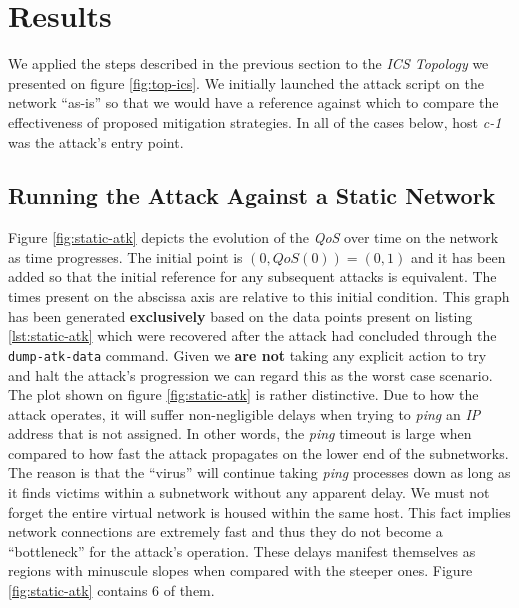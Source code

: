     \section{Results}
        We applied the steps described in the previous section to the \textit{ICS Topology} we presented on figure \ref{fig:top-ics}. We initially launched the attack script on the network ``as-is'' so that we would have a reference against which to compare the effectiveness of proposed mitigation strategies. In all of the cases below, host \textit{c-1} was the attack's entry point.\\

        \subsection{Running the Attack Against a Static Network}
            Figure \ref{fig:static-atk} depicts the evolution of the \textit{QoS} over time on the network as time progresses. The initial point is $(0, QoS(0)) = (0, 1)$ and it has been added so that the initial reference for any subsequent attacks is equivalent. The times present on the abscissa axis are relative to this initial condition. This graph has been generated \textbf{exclusively} based on the data points present on listing \ref{lst:static-atk} which were recovered after the attack had concluded through the \texttt{dump-atk-data} command. Given we \textbf{are not} taking any explicit action to try and halt the attack's progression we can regard this as the worst case scenario.\\

            The plot shown on figure \ref{fig:static-atk} is rather distinctive. Due to how the attack operates, it will suffer non-negligible delays when trying to \textit{ping} an \textit{IP} address that is not assigned. In other words, the \textit{ping} timeout is large when compared to how fast the attack propagates on the lower end of the subnetworks. The reason is that the ``virus'' will continue taking \textit{ping} processes down as long as it finds victims within a subnetwork without any apparent delay. We must not forget the entire virtual network is housed within the same host. This fact implies network connections are extremely fast and thus they do not become a ``bottleneck'' for the attack's operation. These delays manifest themselves as regions with minuscule slopes when compared with the steeper ones. Figure \ref{fig:static-atk} contains $6$ of them.\\

